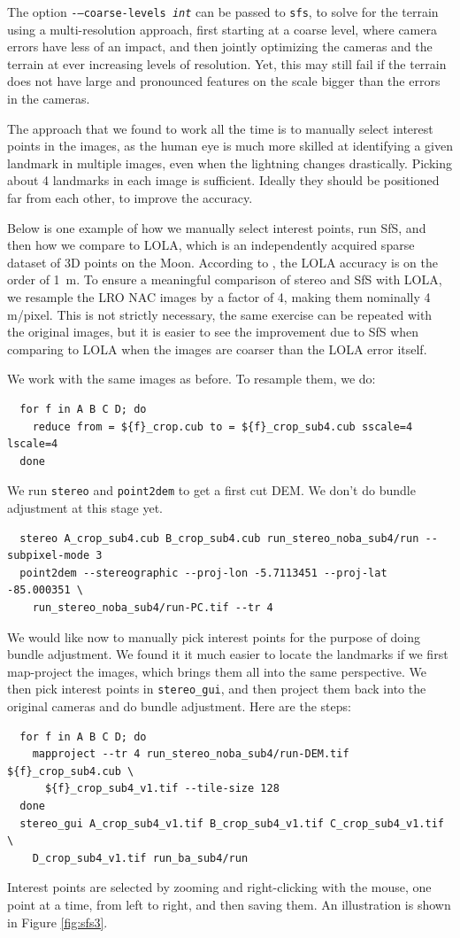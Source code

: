 The option \texttt{-\/--coarse-levels \it{int}} can be passed to
\texttt{sfs}, to solve for the terrain using a multi-resolution
approach, first starting at a coarse level, where camera errors have
less of an impact, and then jointly optimizing the cameras and
the terrain at ever increasing levels of resolution. Yet, this may still
fail if the terrain does not have large and pronounced features on the
scale bigger than the errors in the cameras.

The approach that we found to work all the time is to manually select
interest points in the images, as the human eye is much more skilled at
identifying a given landmark in multiple images, even when the lightning
changes drastically. Picking about 4 landmarks in each image is
sufficient. Ideally they should be positioned far from each other, to
improve the accuracy.

Below is one example of how we manually select interest points, run SfS,
and then how we compare to LOLA, which is an independently acquired
sparse dataset of 3D points on the Moon. According to
\cite{smith2011results}, the LOLA accuracy is on the order of 1~m. To
ensure a meaningful comparison of stereo and SfS with LOLA, we resample
the LRO NAC images by a factor of 4, making them nominally 4
m/pixel. This is not strictly necessary, the same exercise can be
repeated with the original images, but it is easier to see the
improvement due to SfS when comparing to LOLA when the images are
coarser than the LOLA error itself.

We work with the same images as before. To resample them, we do:
\begin{verbatim}
  for f in A B C D; do 
    reduce from = ${f}_crop.cub to = ${f}_crop_sub4.cub sscale=4 lscale=4
  done
\end{verbatim}

We run \texttt{stereo} and \texttt{point2dem} to get a first cut DEM. We don't do bundle
adjustment at this stage yet. 
\begin{verbatim}
  stereo A_crop_sub4.cub B_crop_sub4.cub run_stereo_noba_sub4/run --subpixel-mode 3
  point2dem --stereographic --proj-lon -5.7113451 --proj-lat -85.000351 \
    run_stereo_noba_sub4/run-PC.tif --tr 4 
\end{verbatim}

We would like now to manually pick interest points for the purpose of
doing bundle adjustment.  We found it it much easier to locate the landmarks if we 
first map-project the images, which brings them all into the same
perspective. We then pick interest points in \texttt{stereo\_gui}, and then project
them back into the original cameras and do bundle adjustment. Here are
the steps:
\begin{verbatim}
  for f in A B C D; do 
    mapproject --tr 4 run_stereo_noba_sub4/run-DEM.tif ${f}_crop_sub4.cub \
      ${f}_crop_sub4_v1.tif --tile-size 128
  done
  stereo_gui A_crop_sub4_v1.tif B_crop_sub4_v1.tif C_crop_sub4_v1.tif \
    D_crop_sub4_v1.tif run_ba_sub4/run
\end{verbatim}
Interest points are selected by zooming and right-clicking with the
mouse, one point at a time, from left to right, and then saving them. An
illustration is shown in Figure \ref{fig:sfs3}.

